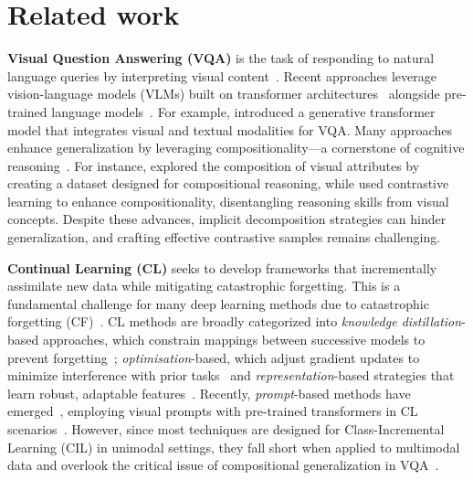 \section{Related work}
\label{sec:related}
\noindent\textbf{Visual Question Answering (VQA)} is the task of responding to natural language queries by interpreting visual content~\cite{antol2015vqa,Naik_2023_ICCV,Li_2024_CVPR}. Recent approaches leverage vision-language models (VLMs) built on transformer architectures~\citep{fields2023vision, shi2024non, xiao2022video, lei2021less, cheng2023vindlu} alongside pre-trained language models~\citep{yang2022zero, yu2023self}. For example, \citet{cho2021unifying} introduced a generative transformer model that integrates visual and textual modalities for VQA. Many approaches enhance generalization by leveraging compositionality—a cornerstone of cognitive reasoning~\citep{keysers2019measuring, lake2017building}. For instance, \citet{johnson2017clevr} explored the composition of visual attributes by creating a dataset designed for compositional reasoning, while \citet{whitehead2021separating} used contrastive learning to enhance compositionality, disentangling reasoning skills from visual concepts. Despite these advances, implicit decomposition strategies can hinder generalization, and crafting effective contrastive samples remains challenging.
 
\noindent \textbf{Continual Learning (CL)} seeks to develop frameworks that incrementally assimilate new data while mitigating catastrophic forgetting. This is a fundamental challenge for many deep learning methods due to catastrophic forgetting (CF)~\citep{mcclelland1995there}. CL methods are broadly categorized into \emph{knowledge distillation}-based approaches, which constrain mappings between successive models to prevent forgetting~\citep{li2017learning, icarl, 8953661, 9880426, douillard2020podnetpooledoutputsdistillation,Kang2022afc}; \emph{optimisation}-based, which adjust gradient updates to minimize interference with prior tasks~\cite{lopez2017gradient,chaudhry2018efficient, saha2021gradient, Yang_2023_ICCV} and \emph{representation}-based strategies that learn robust, adaptable features~\cite{gao2023unified,foret2020sharpness,ermis2022memory,douillard2022dytox}. Recently, \emph{prompt}-based methods have emerged~\citep{wang2022learning, wang2022dualprompt, wang2022s, smith2023coda}, employing visual prompts with pre-trained transformers in CL scenarios~\citep{liu2023pre}. However, since most techniques are designed for Class-Incremental Learning (CIL) in unimodal settings, they fall short when applied to multimodal data and overlook the critical issue of compositional generalization in VQA~\citep{zhang2023vqacl, nikandrou2022task}.

